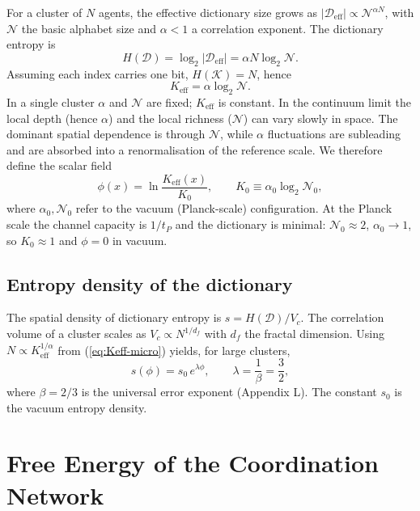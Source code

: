 \documentclass[12pt,a4paper]{article}
\newcommand{\Dir}{\mathcal{D}}
\begin{document}
	For a cluster of \(N\) agents, the effective dictionary size grows as \(|\Dir_{\mathrm{eff}}| \propto \mathcal{N}^{\alpha N}\), with \(\mathcal{N}\) the basic alphabet size and \(\alpha<1\) a correlation exponent. The dictionary entropy is
	\[
	H(\Dir) = \log_2 |\Dir_{\mathrm{eff}}| = \alpha N \log_2 \mathcal{N}.
	\]
	Assuming each index carries one bit, \(H(\mathcal{K}) = N\), hence
	\begin{equation}
		K_{\mathrm{eff}} = \alpha \log_2 \mathcal{N}. \label{eq:Keff-micro}
	\end{equation}
	In a single cluster \(\alpha\) and \(\mathcal{N}\) are fixed; \(K_{\mathrm{eff}}\) is constant. In the continuum limit the local depth (hence \(\alpha\)) and the local richness (\(\mathcal{N}\)) can vary slowly in space. The dominant spatial dependence is through \(\mathcal{N}\), while \(\alpha\) fluctuations are subleading and are absorbed into a renormalisation of the reference scale. We therefore define the scalar field
	\begin{equation}
		\phi(x) = \ln \frac{K_{\mathrm{eff}}(x)}{K_0}, \qquad K_0 \equiv \alpha_0 \log_2 \mathcal{N}_0,
		\label{eq:phi-def}
	\end{equation}
	where \(\alpha_0,\mathcal{N}_0\) refer to the vacuum (Planck-scale) configuration. At the Planck scale the channel capacity is \(1/t_P\) and the dictionary is minimal: \(\mathcal{N}_0 \approx 2\), \(\alpha_0 \rightarrow 1\), so \(K_0 \approx 1\) and \(\phi=0\) in vacuum.
	
	\subsection{Entropy density of the dictionary}
	The spatial density of dictionary entropy is \(s = H(\Dir)/V_c\). The correlation volume of a cluster scales as \(V_c \propto N^{1/d_f}\) with \(d_f\) the fractal dimension. Using \(N \propto K_{\mathrm{eff}}^{1/\alpha}\) from (\ref{eq:Keff-micro}) yields, for large clusters,
	\begin{equation}
		s(\phi) = s_0\, e^{\lambda\phi}, \qquad \lambda = \frac{1}{\beta} = \frac{3}{2},
		\label{eq:s-phi}
	\end{equation}
	where \(\beta = 2/3\) is the universal error exponent (Appendix L). The constant \(s_0\) is the vacuum entropy density.
	
	\section{Free Energy of the Coordination Network}
	
\end{document}
